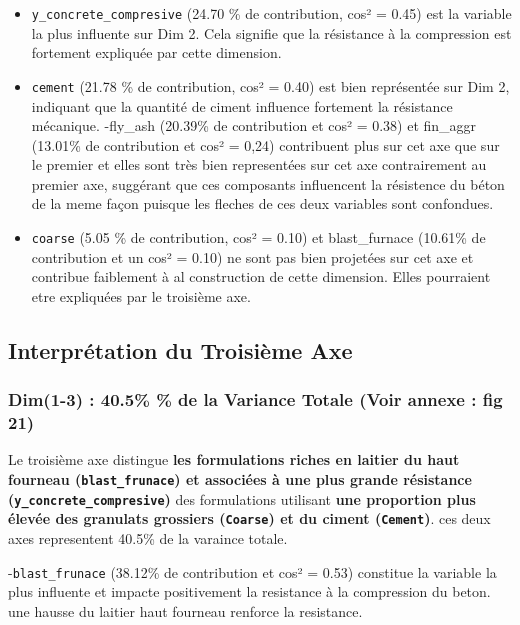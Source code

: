 \documentclass[
  12pt,
]{article}
\providecommand{\tightlist}{%
  \setlength{\itemsep}{0pt}\setlength{\parskip}{0pt}}
\begin{document}
\begin{itemize}
\tightlist
\item
  \texttt{y\_concrete\_compresive} (24.70 \% de contribution, cos² =
  0.45) est la variable la plus influente sur Dim 2. Cela signifie que
  la résistance à la compression est fortement expliquée par cette
  dimension.
\item
  \texttt{cement} (21.78 \% de contribution, cos² = 0.40) est bien
  représentée sur Dim 2, indiquant que la quantité de ciment influence
  fortement la résistance mécanique. -fly\_ash (20.39\% de contribution
  et cos² = 0.38) et fin\_aggr (13.01\% de contribution et cos² = 0,24)
  contribuent plus sur cet axe que sur le premier et elles sont très
  bien representées sur cet axe contrairement au premier axe, suggérant
  que ces composants influencent la résistence du béton de la meme façon
  puisque les fleches de ces deux variables sont confondues.
\item
  \texttt{coarse} (5.05 \% de contribution, cos² = 0.10) et
  blast\_furnace (10.61\% de contribution et un cos² = 0.10) ne sont pas
  bien projetées sur cet axe et contribue faiblement à al construction
  de cette dimension. Elles pourraient etre expliquées par le troisième
  axe.
\end{itemize}

\subsection{Interprétation du Troisième
Axe}\label{interpruxe9tation-du-troisiuxe8me-axe}

\subsubsection{Dim(1-3) : 40.5\% \% de la Variance Totale (Voir annexe :
fig 21)}\label{dim1-3-40.5-de-la-variance-totale-voir-annexe-fig-21}

Le troisième axe distingue \textbf{les formulations riches en laitier du
haut fourneau (\texttt{blast\_frunace}) et associées à une plus grande
résistance (\texttt{y\_concrete\_compresive})} des formulations
utilisant \textbf{une proportion plus élevée des granulats grossiers
(\texttt{Coarse}) et du ciment (\texttt{Cement})}. ces deux axes
representent 40.5\% de la varaince totale.

-\texttt{blast\_frunace} (38.12\% de contribution et cos² = 0.53)
constitue la variable la plus influente et impacte positivement la
resistance à la compression du beton. une hausse du laitier haut
fourneau renforce la resistance.
\end{document}
